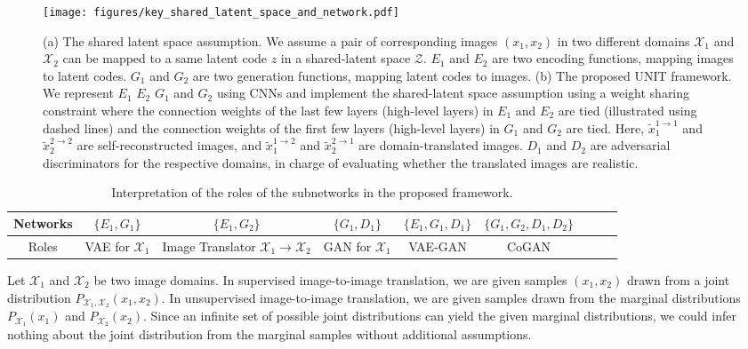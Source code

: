 \documentclass{article}
\begin{document}
\begin{figure*}[t]
\centering
\texttt{[image: figures/key\_shared\_latent\_space\_and\_network.pdf]}
\caption{\small (a) The shared latent space assumption. We assume a pair of corresponding images $(x_1,x_2)$ in two different domains $\mathcal{X}_1$ and $\mathcal{X}_2$ can be mapped to a same latent code $z$ in a shared-latent space $\mathcal{Z}$. $E_1$ and $E_2$ are two encoding functions, mapping images to latent codes. $G_1$ and $G_2$ are two generation functions, mapping latent codes to images. (b) The proposed UNIT framework. We represent $E_1$ $E_2$ $G_1$ and $G_2$ using CNNs and implement the shared-latent space assumption using a weight sharing constraint where the connection weights of the last few layers (high-level layers) in $E_1$ and $E_2$ are tied (illustrated using dashed lines) and the connection weights of the first few layers (high-level layers) in $G_1$ and $G_2$ are tied. Here, $\tilde{x}_1^{1\rightarrow 1}$ and $\tilde{x}_2^{2\rightarrow 2}$ are self-reconstructed images, and $\tilde{x}_1^{1\rightarrow 2}$ and $\tilde{x}_2^{2\rightarrow 1}$ are domain-translated images. $D_1$ and $D_2$ are adversarial discriminators for the respective domains, in charge of evaluating whether the translated images are realistic.}
\label{fig::network}
\vspace{-4 mm}
\end{figure*}
\begin{table}[t]
\caption{\small Interpretation of the roles of the subnetworks in the proposed framework.}\label{tbl::subnetworks}
\centering
\small
{\tabcolsep=4pt
\begin{tabularx}{395pt}{c|cccccccc}\toprule
Networks & 
$\{ E_1, G_1\}$ &
$\{ E_1, G_2\}$ & 
$\{ G_1, D_1\}$ & 
$\{ E_1, G_1, D_1\}$ & 
$\{ G_1, G_2, D_1, D_2\}$ \tabularnewline\midrule
Roles &
VAE for $\mathcal{X}_1$ &
Image Translator $\mathcal{X}_1\rightarrow\mathcal{X}_2$ &
GAN for $\mathcal{X}_1$ & 
VAE-GAN \cite{larsen2015autoencoding} & 
CoGAN \cite{liu2016coupled}
\tabularnewline\midrule
\end{tabularx}}
\vspace{-4mm}
\end{table}


Let $\mathcal{X}_1$ and $\mathcal{X}_2$ be two image domains. In supervised image-to-image translation, we are given samples $(x_1,x_2)$ drawn from a joint distribution $P_{\mathcal{X}_1,\mathcal{X}_2}(x_1, x_2)$. In unsupervised image-to-image translation, we are given samples drawn from the marginal distributions $P_{\mathcal{X}_1}(x_1)$ and $P_{\mathcal{X}_2}(x_2)$. Since an infinite set of possible joint distributions can yield the given marginal distributions, we could infer nothing about the joint distribution from the marginal samples without additional assumptions.
\end{document}
